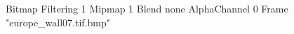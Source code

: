 {Bitmap
	{Filtering 1}
	{Mipmap 1}
	{Blend none}
	{AlphaChannel 0}
	{Frame "europe_wall07.tif.bmp"}
}
